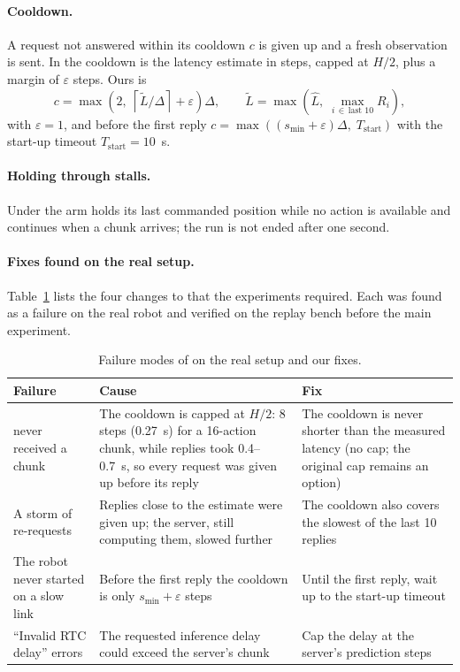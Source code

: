 \paragraph{Cooldown.} A request not answered within its cooldown $c$ is given up and a fresh observation is sent. In
\drtc{} the cooldown is the latency estimate in steps, capped at $H/2$, plus a margin of $\varepsilon$ steps. Ours is
\begin{equation}
  c = \max\!\left(2,\; \left\lceil \tilde L / \Delta \right\rceil + \varepsilon\right)\Delta, \qquad
  \tilde L = \max\!\left(\hat L,\; \max_{i\,\in\,\text{last 10}} R_i\right),
\end{equation}
with $\varepsilon = 1$, and before the first reply $c = \max\!\left((s_{\min}+\varepsilon)\Delta,\;
T_{\mathrm{start}}\right)$ with the start-up timeout $T_{\mathrm{start}}=10$~s.

\paragraph{Holding through stalls.} Under \drtc{} the arm holds its last commanded position while no action is
available and continues when a chunk arrives; the run is not ended after one second.

\paragraph{Fixes found on the real setup.} Table~\ref{tab:fixes} lists the four changes to \drtc{} that the
experiments required. Each was found as a failure on the real robot and verified on the replay bench before the main
experiment.

\begin{table}[htbp]
  \centering
  \caption{Failure modes of \drtc{} on the real setup and our fixes.}
  \label{tab:fixes}
  \begin{tabularx}{\textwidth}{>{\raggedright\arraybackslash}p{} X X}
    \toprule
    Failure & Cause & Fix \\
    \midrule
    \groot{} never received a chunk & The cooldown is capped at $H/2$: 8 steps (0.27~s) for a 16-action chunk, while
      replies took 0.4--0.7~s, so every request was given up before its reply & The cooldown is never shorter than the
      measured latency (no cap; the original cap remains an option) \\
    A storm of re-requests & Replies close to the estimate were given up; the server, still computing them, slowed
      further & The cooldown also covers the slowest of the last 10 replies \\
    The robot never started on a slow link & Before the first reply the cooldown is only $s_{\min}+\varepsilon$ steps
      & Until the first reply, wait up to the start-up timeout \\
    \enquote{Invalid RTC delay} errors & The requested inference delay could exceed the server's chunk & Cap the
      delay at the server's prediction steps \\
    \bottomrule
  \end{tabularx}
\end{table}

